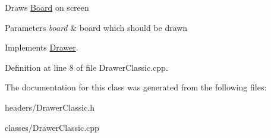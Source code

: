 Draws \hyperlink{classBoard}{Board} on screen 
\begin{DoxyParams}{Parameters}
{\em board} & board which should be drawn \\
\hline
\end{DoxyParams}


Implements \hyperlink{classDrawer_afe75fce45596f02f01514322ebd57c8c}{Drawer}.



Definition at line 8 of file Drawer\+Classic.\+cpp.



The documentation for this class was generated from the following files\+:\begin{DoxyCompactItemize}
\item 
headers/Drawer\+Classic.\+h\item 
classes/Drawer\+Classic.\+cpp\end{DoxyCompactItemize}
